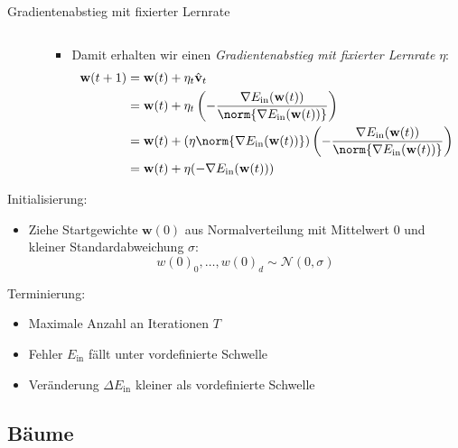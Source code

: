 \begin{defi}{Gradientenabstieg mit fixierter Lernrate}
\begin{enumerate}
\begin{itemize}
\begin{itemize}
\[                                  \]
                            \item Damit erhalten wir einen \emph{Gradientenabstieg mit fixierter Lernrate} $\eta$:
                                  \begin{alignat*}{1}
                                      \mathbf{w}(t+1) & = \mathbf{w}(t) + \eta_t \hat{\mathbf{v}}_t                                                                                                                                       \\
                                                      & = \mathbf{w}(t) + \eta_t \left( - \frac{\nabla E_\text{in}(\mathbf{w}(t))}{\norm{\nabla E_\text{in}(\mathbf{w}(t))}} \right)                                                      \\
                                                      & = \mathbf{w}(t) + \left( \eta \norm{\nabla E_\text{in}(\mathbf{w}(t))} \right) \left( -\frac{\nabla E_\text{in}(\mathbf{w}(t))}{\norm{\nabla E_\text{in}(\mathbf{w}(t))}} \right) \\
                                                      & = \mathbf{w}(t) + \eta (-\nabla E_\text{in}(\mathbf{w}(t)))
                                  \end{alignat*}
                        \end{itemize}
              \end{itemize}
    \end{enumerate}

    Initialisierung:
    \begin{itemize}
        \item Ziehe Startgewichte $\mathbf{w}(0)$ aus Normalverteilung mit Mittelwert $0$ und kleiner Standardabweichung $\sigma$:
              \[
                  w(0)_0, \ldots, w(0)_d \sim \mathcal{N}(0, \sigma)
              \]
    \end{itemize}

    Terminierung:
    \begin{itemize}
        \item Maximale Anzahl an Iterationen $T$
        \item Fehler $E_\text{in}$ fällt unter vordefinierte Schwelle
        \item Veränderung $\Delta E_\text{in}$ kleiner als vordefinierte Schwelle
    \end{itemize}
\end{defi}

\subsection{Bäume}

